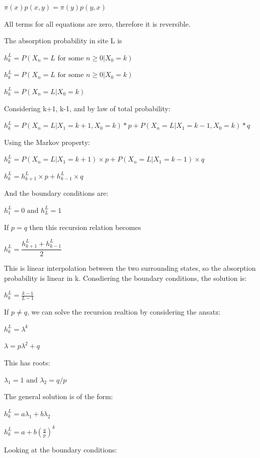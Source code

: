\documentclass{article}
\begin{document}
$\pi(x)p(x,y) = \pi(y)p(y,x)$ 

All terms for all equations are zero, therefore it is reversible.


\bigskip




The absorption probability in site L is 

$h_k^L = P(X_n = L \text{ for some } n \geq 0|X_0 = k)$


$h_k^L = P(X_n = L \text{ for some } n \geq 0|X_0 = k)$

$h_k^L = P(X_n = L | X_0 = k)$

Considering k+1, k-1, and by law of total probability:

$h_{k}^L = P(X_n = L | X_1 = k+1, X_0 = k) * p + P(X_n = L | X_1 = k-1, X_0 = k) * q $

Using the Markov property:

$h_{k}^L = P(X_n = L | X_1 = k+1) \times p + P(X_n = L | X_1 = k-1) \times q $

\bigskip

$h_{k}^L = h_{k+1}^L \times p + h_{k-1}^L \times q $

And the boundary conditions are:

$h_{1}^L = 0 \text{ and } h_{L}^L = 1$

\bigskip

If $p=q$ then this recursion relation becomes 

$h_{k}^L = \dfrac{h_{k+1}^L + h_{k-1}^L}{2} $

This is linear interpolation between the two surrounding states, so the absorption probability is linear in k. Consdiering the boundary conditions, the solution is:

$h_{k}^L = \frac{k-1}{L-1}$

\bigskip

If $p\neq q$, we can solve the recursion realtion by considering the ansatz:


$h_{k}^L = \lambda^k $

$\lambda = p \lambda^2 + q$

This has roots:

$\lambda_1 = 1 \text{ and } \lambda_2 = q/p$



The general solution is of the form:

$h_k^L = a\lambda_1 + b\lambda_2$ 

$h_k^L = a + b(\frac{q}{p})^k$ 


Looking at the boundary conditions:
\end{document}
